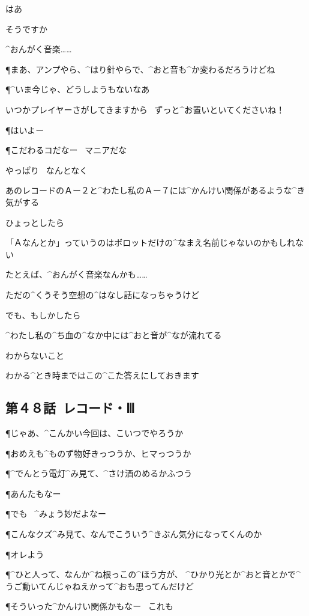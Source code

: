\K はあ

\K そうですか

\K ^{おんがく}{音楽}……

\page
\P まあ、アンプやら、^{はり}{針}やらで、^{おと}{音}も^{か}{変}わるだろうけどね

\P ^{いま}{今}じゃ、どうしようもないなあ

\K いつかプレイヤーさがしてきますから
\ ずっと^{お}{置}いといてくださいね！

\P はいよー

\P こだわるコだなー
\ マニアだな

\page
\K やっぱり
\ なんとなく

\K あのレコードのＡー２と^{わたし}{私}のＡー７には^{かんけい}{関係}があるような^{き}{気}がする

\page
\K ひょっとしたら

\K 「Ａなんとか」っていうのはボロットだけの^{なまえ}{名前}じゃないのかもしれない

\K たとえば、^{おんがく}{音楽}なんかも……

\page
\K ただの^{くうそう}{空想}の^{はなし}{話}になっちゃうけど

\K でも、もしかしたら

\K ^{わたし}{私}の^{ち}{血}の^{なか}{中}には^{おと}{音}が^{なが}{流}れてる

\page[64]
\K わからないこと

\K わかる^{とき}{時}まではこの^{こた}{答}えにしておきます


\subsection{第４８話\ レコード・Ⅲ}

\page[68]
\P じゃあ、^{こんかい}{今回}は、こいつでやろうか

\P おめえも^{ものず}{物好}きっつうか、ヒマっつうか

\P ^{でんとう}{電灯}^{み}{見}て、^{さけ}{酒}のめるかふつう

\P あんたもなー

\page[70]
\P でも
\ ^{みょう}{妙}だよなー

\P こんなクズ^{み}{見}て、なんでこういう^{きぶん}{気分}になってくんのか

\P オレよう

\P ^{ひと}{人}って、なんか^{ね}{根}っこの^{ほう}{方}が、
^{ひかり}{光}とか^{おと}{音}とかで^{うご}{動}いてんじゃねえかって^{おも}{思}ってんだけど

\P そういった^{かんけい}{関係}かもなー
\ これも


